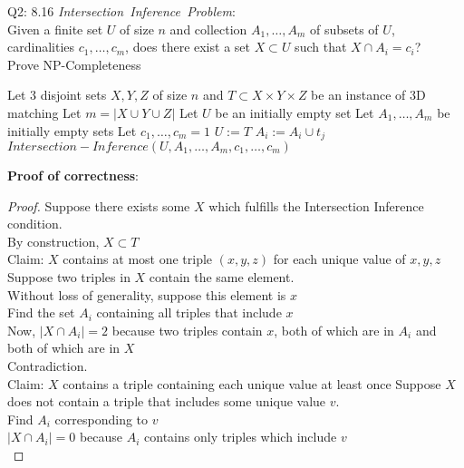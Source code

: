 \begin{problem}
    {Q2: 8.16}
    \textit{Intersection~Inference~Problem}: \\
    Given a finite set $U$ of size $n$ and collection $A_1, \dots, A_m$ of subsets of $U$, cardinalities $c_1, \dots, c_m$, does there exist
    a set $X \subset U$ such that $X \cap A_i = c_i$? \\
    Prove NP-Completeness
    \begin{algorithmic}[1]
    \STATE Let 3 disjoint sets $X, Y, Z$ of size $n$ and $T \subset X \times Y \times Z$ be an instance of 3D matching
    \STATE Let $m = |X \cup Y \cup Z|$
    \STATE Let $U$ be an initially empty set
    \STATE Let $A_1, \dots, A_m$ be initially empty sets
    \STATE Let $c_1, \dots, c_m = 1$
    \STATE $U := T$
                \STATE $A_i := A_i \cup t_j$
            \ENDIF
        \ENDFOR
    \ENDFOR
    \RETURN $Intersection-Inference(U, A_1, \dots, A_m, c_1, \dots, c_m)$
    \end{algorithmic}
    \noindent
    \textbf{Proof of correctness}:
    \begin{proof}
        Suppose there exists some $X$ which fulfills the Intersection Inference condition. \\
        By construction, $X \subset T$ \\
        Claim: $X$ contains at most one triple $(x,y,z)$ for each unique value of $x, y, z$ \\
        Suppose two triples in $X$ contain the same element. \\
        Without loss of generality, suppose this element is $x$ \\
        Find the set $A_i$ containing all triples that include $x$ \\
        Now, $|X \cap A_i| = 2$ because two triples contain $x$, both of which are in $A_i$ and both of which are in $X$ \\
        Contradiction. \\
        Claim: $X$ contains a triple containing each unique value at least once
        Suppose $X$ does not contain a triple that includes some unique value $v$. \\
        Find $A_i$ corresponding to $v$ \\
        $|X \cap A_i| = 0$ because $A_i$ contains only triples which include $v$ \\

\end{proof}
\end{problem}
